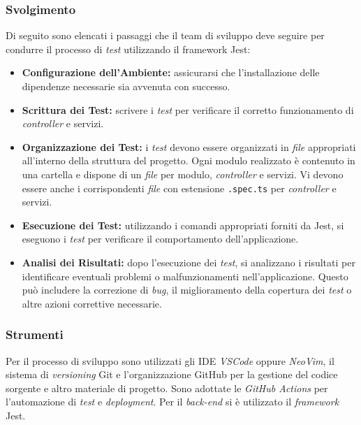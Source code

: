 \subsubsection*{Svolgimento}
Di seguito sono elencati i passaggi che il team di sviluppo deve seguire per condurre il processo di \textit{test} utilizzando il framework Jest:
\begin{itemize}
	\item \textbf{Configurazione dell'Ambiente:} assicurarsi che l'installazione delle dipendenze necessarie sia avvenuta con successo.
	\item \textbf{Scrittura dei Test:} scrivere i \textit{test} per verificare il corretto funzionamento di \textit{controller} e servizi.
	\item \textbf{Organizzazione dei Test:} i \textit{test} devono essere organizzati in \textit{file} appropriati all'interno della struttura del progetto.
		Ogni modulo realizzato è contenuto in una cartella e dispone di un \textit{file} per modulo, \textit{controller} e servizi.
		Vi devono essere anche i corrispondenti \textit{file} con estensione \texttt{.spec.ts} per \textit{controller} e servizi.
	\item \textbf{Esecuzione dei Test:} utilizzando i comandi appropriati forniti da Jest, si eseguono i \textit{test} per verificare il comportamento dell'applicazione.
	\item \textbf{Analisi dei Risultati:} dopo l'esecuzione dei \textit{test}, si analizzano i risultati per identificare eventuali problemi o malfunzionamenti nell'applicazione. 
		Questo può includere la correzione di \textit{bug}, il miglioramento della copertura dei \textit{test} o altre azioni correttive necessarie.
\end{itemize}

\subsubsection*{Strumenti}
Per il processo di sviluppo sono utilizzati gli IDE \textit{VSCode} oppure  \textit{NeoVim}, il sistema di \textit{versioning} Git e l'organizzazione {GitHub\g} per la gestione del codice
sorgente e altro materiale di progetto. 
Sono adottate le \textit{GitHub Actions} per l'automazione di \textit{test} e \textit{deployment}.
Per il \textit{back-end} si è utilizzato il \textit{framework} Jest.
